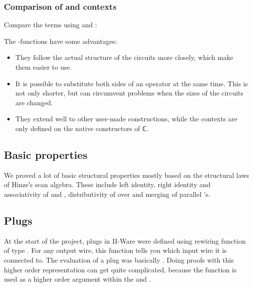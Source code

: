 \subsubsection{\texorpdfstring{Comparison of  and contexts}{Comparison of X-cong and contexts}}\label{comparison-of-x-cong-and-contexts}

Compare the terms using  and :



The -functions have some advantages:

\begin{itemize}
\item They follow the actual structure of the circuits more closely,
  which make them easier to use.
\item It is possible to substitute both sides of an operator at the
  same time.
  This is not only shorter, but can circumvent problems when the sizes
  of the circuits are changed.
\item They extend well to other user-made constructions, while the
  contexts are only defined on the native constructors of ℂ.
\end{itemize}


\subsection{Basic properties}\label{basic-properties}

We proved a lot of basic structural properties mostly based on the
structural laws of Hinze′s scan algebra.
These include left identity, right identity and associativity of
 and , distributivity of  over  and merging of
parallel 's.

\subsection{Plugs}\label{plugs}

At the start of the project, plugs in Π-Ware were defined using
rewiring function of type     .
For any output wire, this function tells you which input wire it is
connected to.
The evaluation of a plug was basically    
 \AY{=}     
\AY{(} \AY{)} \AY{)}.
Doing proofs with this higher order representation can get quite
complicated, because the function is used as a higher order argument
within the  and .

